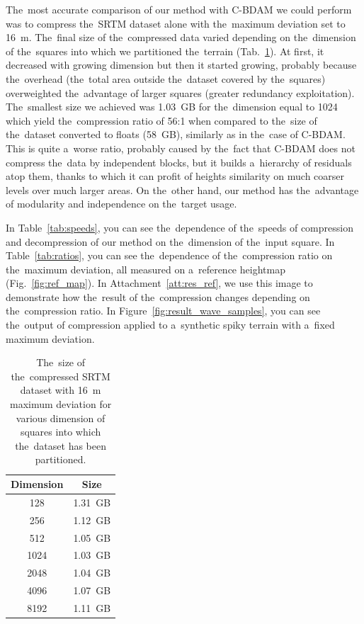 The~most accurate comparison of our method with C-BDAM we could perform was to compress the~SRTM dataset alone with the~maximum deviation set to 16~m. The~final size of the~compressed data varied depending on the~dimension of the~squares into which we partitioned the~terrain (Tab.~\ref{tab:srtm}). At first, it decreased with growing dimension but then it started growing, probably because the~overhead (the~total area outside the~dataset covered by the~squares) overweighted the~advantage of larger squares (greater redundancy exploitation). The~smallest size we achieved was 1.03~GB for the~dimension equal to 1024 which yield the~compression ratio of 56:1 when compared to the~size of the~dataset converted to floats (58~GB), similarly as in the~case of C-BDAM. This is quite a~worse ratio, probably caused by the~fact that C-BDAM does not compress the~data by independent blocks, but it builds a~hierarchy of residuals atop them, thanks to which it can profit of heights similarity on much coarser levels over much larger areas. On the~other hand, our method has the~advantage of modularity and independence on the~target usage.

In Table~\ref{tab:speeds}, you can see the~dependence of the~speeds of compression and decompression of our method on the~dimension of the~input square. In Table~\ref{tab:ratios}, you can see the~dependence of the~compression ratio on the~maximum deviation, all measured on a~reference heightmap (Fig.~\ref{fig:ref_map}). In Attachment~\ref{att:res_ref}, we use this image to demonstrate how the~result of the~compression changes depending on the~compression ratio. In Figure~\ref{fig:result_wave_samples}, you can see the~output of compression applied to a~synthetic spiky terrain with a~fixed maximum deviation.

\begin{table}
	\begin{center}
		\begin{tabular}{ | c | c | }
			\hline
			Dimension & Size \\ \hline
			128 & 1.31~GB  \\ \hline
			256 & 1.12~GB \\ \hline
			512 & 1.05~GB  \\ \hline
			1024 & 1.03~GB \\ \hline
			2048 & 1.04~GB \\ \hline
			4096 & 1.07~GB \\ \hline
			8192 & 1.11~GB \\ \hline
		\end{tabular}
		\caption{The~size of the~compressed SRTM dataset with 16~m maximum deviation for various dimension of squares into which the~dataset has been partitioned.}
		\label{tab:srtm}
	\end{center}
\end{table}

